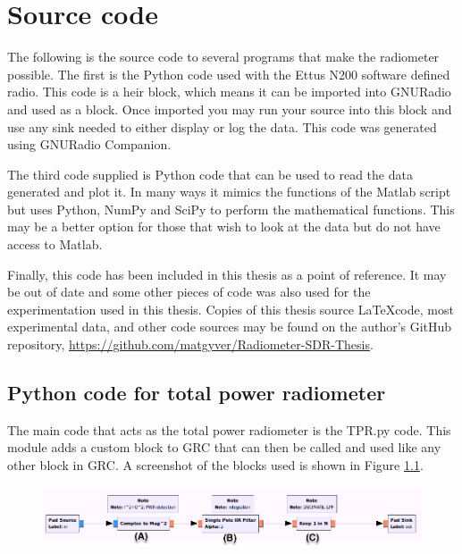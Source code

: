 \appendixtitle
\appendix
\chapter{Source code} \label{appendix1}

The following is the source code to several programs that make the radiometer possible.  The first is the Python code used with the Ettus N200 software defined radio.  This code is a heir block, which means it can be imported into GNURadio and used as a block.  Once imported you may run your source into this block and use any sink needed to either display or log the data.  This code was generated using GNURadio Companion.  


The third code supplied is Python code that can be used to read the data generated and plot it.  In many ways it mimics the functions of the Matlab script but uses Python, NumPy and SciPy to perform the mathematical functions.  This may be a better option for those that wish to look at the data but do not have access to Matlab.

Finally, this code has been included in this thesis as a point of reference.  It may be out of date and some other pieces of code was also used for the experimentation used in this thesis.  Copies of this thesis source \LaTeX code, most experimental data, and other code sources may be found on the author's GitHub repository, \url{https://github.com/matgyver/Radiometer-SDR-Thesis}.

\section*{Python code for total power radiometer}
The main code that acts as the total power radiometer is the TPR.py code.  This module adds a custom block to GRC that can then be called and used like any other block in GRC.  A screenshot of the blocks used is shown in Figure \ref{TPR_GRC}.

{\begin{figure}[h!tb] 
\centering
\includegraphics[width=0.8\linewidth]{Images/TPR_grc.png}
\label{TPR_GRC}
\end{figure}

}


